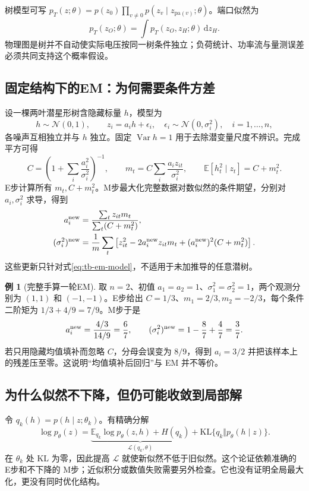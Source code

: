 \documentclass[UTF8,11pt,fontset=fandol,openany,oneside]{ctexbook}
\newcommand{\E}{\mathbb{E}}
\DeclareMathOperator{\Var}{Var}
\theoremstyle{definition}
\newtheorem{example}[theorem]{例}
\theoremstyle{remark}
\numberwithin{equation}{chapter}
\begin{document}
树模型可写 $p_T(z;\theta)=p(z_0)\prod_{v\ne0}p(z_v\mid z_{\mathrm{pa}(v)};\theta)$。端口似然为
\begin{equation}
 p_T(z_O;\theta)=\int p_T(z_O,z_H;\theta)\,\mathrm dz_H.
\end{equation}
物理图是树并不自动使实际电压按同一树条件独立；负荷统计、功率流与量测误差必须共同支持这个概率假设。

\subsection{固定结构下的EM：为何需要条件方差}
设一棵两叶潜星形树含隐藏标量 $h$，模型为
\begin{equation}
 h\sim\mathcal N(0,1),\qquad z_i=a_i h+\epsilon_i,
 \quad\epsilon_i\sim\mathcal N(0,\sigma_i^2),\quad i=1,\ldots,n,
 \label{eq:tb-em-model}
\end{equation}
各噪声互相独立并与 $h$ 独立。固定 $\Var h=1$ 用于去除潜变量尺度不辨识。完成平方可得
\begin{equation}
 C=\left(1+\sum_i\frac{a_i^2}{\sigma_i^2}\right)^{-1},\qquad
 m_t=C\sum_i\frac{a_i z_{it}}{\sigma_i^2},\qquad
 \E[h_t^2\mid z_t]=C+m_t^2.
 \label{eq:tb-em-estep}
\end{equation}
E步计算所有 $m_t,C+m_t^2$。M步最大化完整数据对数似然的条件期望，分别对 $a_i,\sigma_i^2$ 求导，得到
\begin{align}
 a_i^{\rm new}&=\frac{\sum_tz_{it}m_t}{\sum_t(C+m_t^2)},\\
 (\sigma_i^2)^{\rm new}
 &=\frac1m\sum_t\left[z_{it}^2-2a_i^{\rm new}z_{it}m_t
 +(a_i^{\rm new})^2(C+m_t^2)\right].\label{eq:tb-em-mstep}
\end{align}
这些更新只针对式\eqref{eq:tb-em-model}，不适用于未加推导的任意潜树。

\begin{example}[完整手算一轮EM]
取 $n=2$、初值 $a_1=a_2=1$、$\sigma_1^2=\sigma_2^2=1$，两个观测分别为 $(1,1)$ 和 $(-1,-1)$。E步给出 $C=1/3$、$m_1=2/3,m_2=-2/3$，每个条件二阶矩为 $1/3+4/9=7/9$。M步于是
\begin{equation}
 a_i^{\rm new}=\frac{4/3}{14/9}=\frac67,\qquad
 (\sigma_i^2)^{\rm new}=1-\frac87+\frac47=\frac37.
\end{equation}
若只用隐藏均值填补而忽略 $C$，分母会误变为 $8/9$，得到 $a_i=3/2$ 并把该样本上的残差压至零。这说明“均值填补后回归”与 EM 并不等价。
\end{example}

\subsection{为什么似然不下降，但仍可能收敛到局部解}
令 $q_k(h)=p(h\mid z;\theta_k)$。有精确分解
\begin{equation}
 \log p_\theta(z)=
 \underbrace{\E_{q_k}\log p_\theta(z,h)+H(q_k)}_{\mathcal L(q_k,\theta)}
 +\mathrm{KL}\{q_k\Vert p_\theta(h\mid z)\}.
\end{equation}
在 $\theta_k$ 处 KL 为零，因此提高 $\mathcal L$ 就使新似然不低于旧似然。这个论证依赖准确的 E步和不下降的 M步；近似积分或数值失败需要另外检查。它也没有证明全局最大化，更没有同时优化结构。
\end{document}
